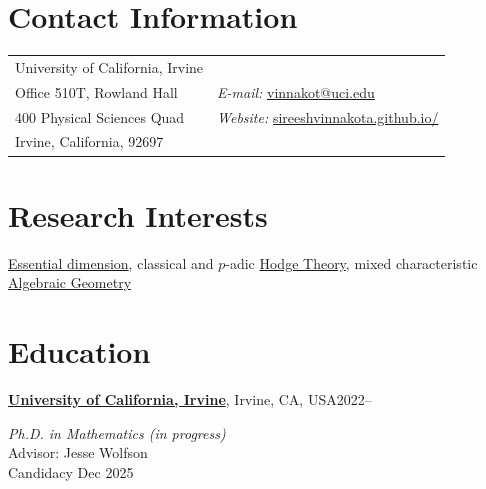 \documentclass[margin,line]{res}
\begin{document}
\begin{resume}
\section{\sc Contact Information}
\vspace{.05in}
\begin{tabular}{@{}p{3in}p{4in}}
University of California, Irvine \\             
Office 510T, Rowland Hall  & {\it E-mail:} \href{mailto:vinnakot@uci.edu}{\color{blue}vinnakot@uci.edu}\\
400 Physical Sciences Quad  & {\it Website:} \href{https://sireeshvinnakota.github.io/}{\color{blue}sireeshvinnakota.github.io/} \\
Irvine, California, 92697 & %
\\
\end{tabular}


\section{\sc Research Interests}

\href{https://en.wikipedia.org/wiki/Essential_dimension}{Essential dimension}, classical and $p$-adic \href{https://en.wikipedia.org/wiki/Hodge_theory}{Hodge Theory}, mixed characteristic \href{https://en.wikipedia.org/wiki/Algebraic_geometry}{Algebraic Geometry}  \\


\vspace*{-1mm}
\section{\sc Education}

{\bf \href{https://uci.edu/}{University of California, Irvine}}, Irvine, CA, USA\hfill 2022--

\vspace{-.35cm}
{\em Ph.D. in Mathematics (in progress)}\\
Advisor: Jesse Wolfson\\
Candidacy \hfill Dec 2025



\end{resume}
\end{document}
